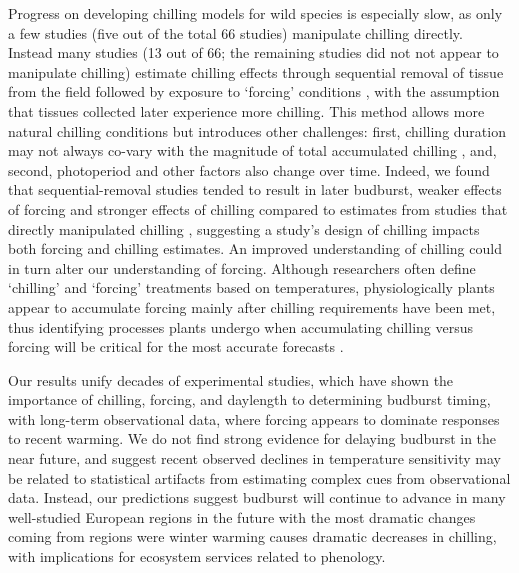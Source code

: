 \documentclass{article}
\begin{document}
\par Progress on developing chilling models for wild species is especially slow, as only a few studies (five out of the total 66 studies) manipulate chilling directly. Instead many studies (13 out of 66; the remaining studies did not not appear to manipulate chilling) estimate chilling effects through sequential removal of tissue from the field followed by exposure to `forcing' conditions \citep{weinberger1950}, with the assumption that tissues collected later experience more chilling. This method allows more natural chilling conditions but introduces other challenges: first, chilling duration may not always co-vary with the magnitude of total accumulated chilling \citep{dennis2003}, and, second, photoperiod and other factors also change over time. Indeed, we found that sequential-removal studies tended to result in later budburst, weaker effects of forcing and stronger effects of chilling compared to estimates from studies that directly manipulated chilling \citep[Fig. 4S][]{weinberger1950,polgar2013}, suggesting a study's design of chilling impacts both forcing and chilling estimates. An improved understanding of chilling could in turn alter our understanding of forcing. Although researchers often define `chilling' and `forcing' treatments based on temperatures, physiologically plants appear to accumulate forcing mainly after chilling requirements have been met,  thus identifying processes plants undergo when accumulating chilling versus forcing will be critical for the most accurate forecasts \citep{chuine2016}.
 \par Our results unify decades of experimental studies, which have shown the importance of chilling, forcing, and daylength to determining budburst timing, with long-term observational data, where forcing appears to dominate responses to recent warming. We do not find strong evidence for delaying budburst in the near future, and suggest recent observed declines in temperature sensitivity may be related to statistical artifacts from estimating complex cues from observational data. Instead, our predictions suggest budburst will continue to advance in many well-studied European regions in the future with the most dramatic changes coming from regions were winter warming causes dramatic decreases in chilling, with implications for ecosystem services related to phenology. %
 
\end{document}
